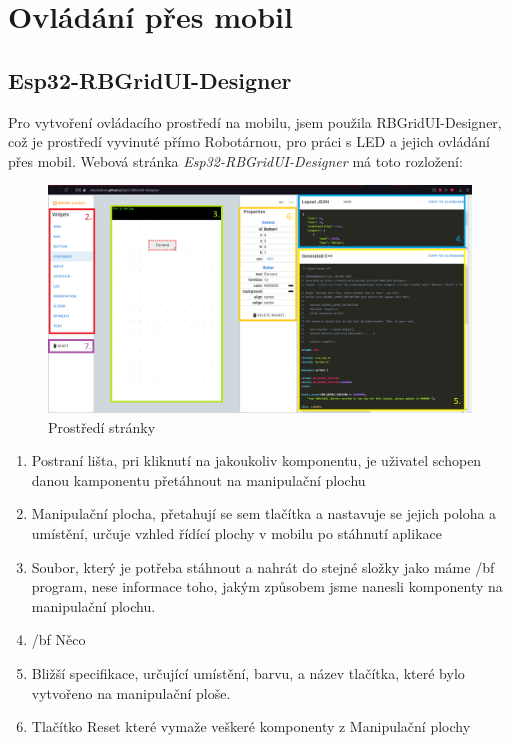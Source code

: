 \chapter{Ovládání přes mobil}


\section{Esp32-RBGridUI-Designer} %
Pro vytvoření ovládacího prostředí na mobilu, jsem použila {RBGridUI-Designer}, \cite{robotárna} což je prostředí vyvinuté přímo Robotárnou,\cite{robotárna} pro práci s LED a jejich ovládání přes mobil. Webová stránka {\em Esp32-RBGridUI-Designer} má toto rozložení: 
\begin{figure}[htbp]
	\centering
	\includegraphics[width=1\textwidth]{img/Esp32-RBGridUI-Designer - malování.png}
	\caption{Prostředí stránky}
\end{figure}

\begin{enumerate}
	\item Postraní lišta, pri kliknutí na jakoukoliv komponentu, je uživatel schopen danou kamponentu přetáhnout na manipulační plochu
	\item Manipulační plocha, přetahují se sem tlačítka a nastavuje se jejich poloha a umístění, určuje vzhled řídící plochy v mobilu po stáhnutí aplikace
	\item Soubor, který je potřeba stáhnout a nahrát do stejné složky jako máme {/bf program}, nese informace toho, jakým způsobem jsme nanesli komponenty na manipulační plochu.
	\item /bf Něco %
	\item Bližší specifikace, určující umístění, barvu, a název tlačítka, které bylo vytvořeno na manipulační ploše. 
	\item Tlačítko Reset které vymaže veškeré komponenty z Manipulační plochy
\end{enumerate}



